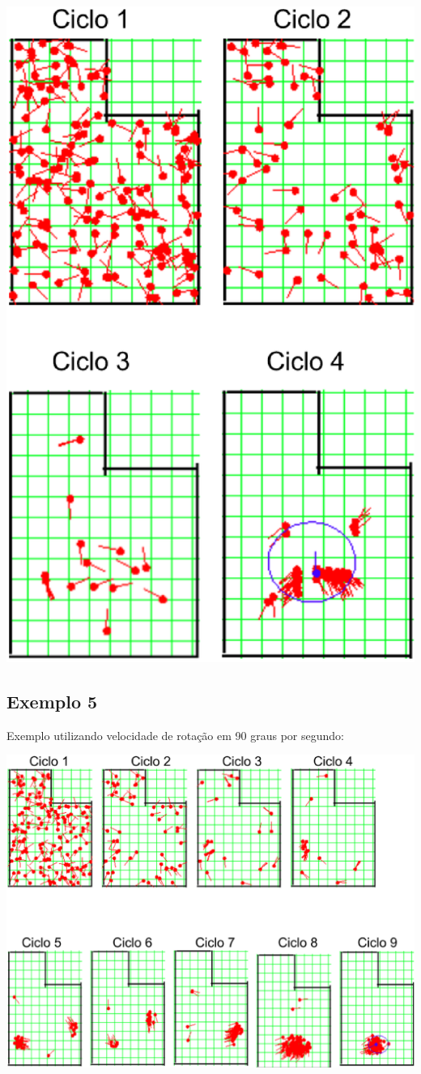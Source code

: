{\centering
\includegraphics[scale=0.4]{figuras/cen2_ex4.eps}
\label{img:cen2_ex4}
\par}

\subsection{Exemplo 5}

Exemplo utilizando velocidade de rotação em 90 graus por segundo:

{\centering
\includegraphics[scale=0.4]{figuras/cen2_ex5.eps}
\label{img:cen2_ex5}
\par}
